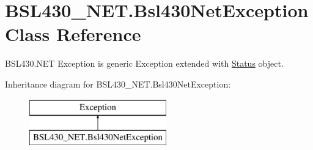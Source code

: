 \hypertarget{class_b_s_l430___n_e_t_1_1_bsl430_net_exception}{}\section{B\+S\+L430\+\_\+\+N\+E\+T.\+Bsl430\+Net\+Exception Class Reference}
\label{class_b_s_l430___n_e_t_1_1_bsl430_net_exception}


B\+S\+L430.\+N\+ET Exception is generic Exception extended with \mbox{\hyperlink{class_b_s_l430___n_e_t_1_1_status}{Status}} object.  


Inheritance diagram for B\+S\+L430\+\_\+\+N\+E\+T.\+Bsl430\+Net\+Exception\+:\begin{figure}[H]
\begin{center}
\leavevmode
\includegraphics[height=2.000000cm]{class_b_s_l430___n_e_t_1_1_bsl430_net_exception}
\end{center}
\end{figure}
